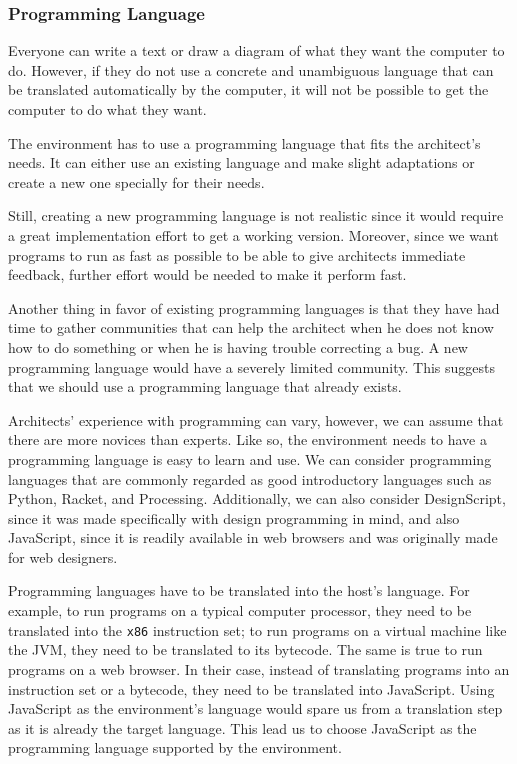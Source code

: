 \subsubsection{Programming Language}
Everyone can write a text or draw a diagram of what they want the computer to do.
However, if they do not use a concrete and unambiguous language that can be translated automatically by the computer, it will not be possible to get the computer to do what they want.

The environment has to use a programming language that fits the architect's needs.
It can either use an existing language and make slight adaptations or create a new one specially for their needs.

Still, creating a new programming language is not realistic since it would require a great implementation effort to get a working version.
Moreover, since we want programs to run as fast as possible to be able to give architects immediate feedback, further effort would be needed to make it perform fast.

Another thing in favor of existing programming languages is that they have had time to gather communities that can help the architect when he does not know how to do something or when he is having trouble correcting a bug.
A new programming language would have a severely limited community.
This suggests that we should use a programming language that already exists.

Architects' experience with programming can vary, however, we can assume that there are more novices than experts.
Like so, the environment needs to have a programming language is easy to learn and use.
We can consider programming languages that are commonly regarded as good introductory languages such as Python, Racket, and Processing.
Additionally, we can also consider DesignScript, since it was made specifically with design programming in mind, and also JavaScript, since it is readily available in web browsers and was originally made for web designers.

Programming languages have to be translated into the host's language.
For example, to run programs on a typical computer processor, they need to be translated into the {\tt x86} instruction set; to run programs on a virtual machine like the JVM, they need to be translated to its bytecode.
The same is true to run programs on a web browser.
In their case, instead of translating programs into an instruction set or a bytecode, they need to be translated into JavaScript.
Using JavaScript as the environment's language would spare us from a translation step as it is already the target language.
This lead us to choose JavaScript as the programming language supported by the environment.

